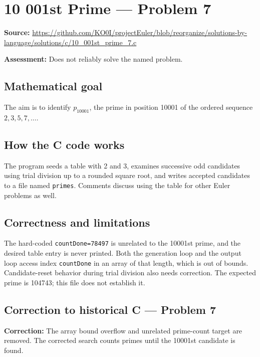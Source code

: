 \section{10 001st Prime --- Problem 7}
\label{prob:7}
\noindent\textbf{Source:} \url{https://github.com/KO0I/projectEuler/blob/reorganize/solutions-by-language/solutions/c/10_001st_prime_7.c}

\noindent\textbf{Assessment:} Does not reliably solve the named problem.

\subsection*{Mathematical goal}
The aim is to identify \(p_{10001}\), the prime in position 10001 of the ordered sequence \(2,3,5,7,\ldots\).

\subsection*{How the C code works}
The program seeds a table with 2 and 3, examines successive odd candidates using trial division up to a rounded square root, and writes accepted candidates to a file named \verb|primes|. Comments discuss using the table for other Euler problems as well.

\subsection*{Correctness and limitations}
The hard-coded \verb|countDone=78497| is unrelated to the 10001st prime, and the desired table entry is never printed. Both the generation loop and the output loop access index \verb|countDone| in an array of that length, which is out of bounds. Candidate-reset behavior during trial division also needs correction. The expected prime is 104743; this file does not establish it.


\subsection*{Correction to historical C --- Problem 7}
{\color{red}\textbf{Correction:} The array bound overflow and unrelated prime-count target are removed. The corrected search counts primes until the 10001st candidate is found.}

